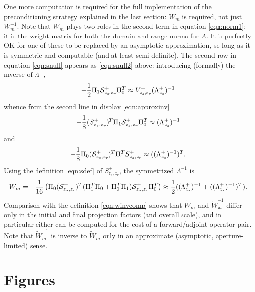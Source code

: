 One more computation is required for the full implementation of the
preconditioning strategy explained in the last section: $W_m$ is
required, not just $W_m^{-1}$. Note that $W_m$ plays two roles in the
second term in equation \ref{eqn:norm1}: it is the weight matrix for
both the domain and range norms for $A$. It is perfectly OK for one of
these to be replaced by an asymptotic approximation, so long as it is
symmetric and computable (and at least semi-definite). The second row
in equation \ref{eqn:snull} appears as \ref{eqn:snull2} above:
introducing (formally) the inverse of $\Lambda^+$,
\begin{equation}
  \label{eqn:snull2mod}
-\frac{1}{2}\Pi_1{\cal S}^{+}_{z_s,z_r}\Pi_0^T  \approx
V^{+}_{z_s,z_r}(\Lambda^{+}_{z_s})^{-1}
\end{equation}
whence from the second line in display \ref{eqn:approxinv}
\begin{equation}
  \label{eqn:laminv}
-\frac{1}{8}(S^+_{z_s,z_r})^T\Pi_1{\cal S}^{+}_{z_s,z_r}\Pi_0^T  
\approx (\Lambda^{+}_{z_s})^{-1}
\end{equation} 
and
\begin{equation}
  \label{eqn:laminvtr}
-\frac{1}{8}\Pi_0({\cal S}^{+}_{z_s,z_r})^T\Pi_1^T S^+_{z_s,z_r}
\approx ((\Lambda^{+}_{z_s})^{-1})^T.
\end{equation}
Using the definition \ref{eqn:sdef} of $S^+_{z_s,z_r}$, the
symmetrized $\Lambda^{-1}$ is
\begin{equation}
  \label{wcomp}
 \tilde{W}_m = -\frac{1}{16}\left(\Pi_0 ({\cal S}^{+}_{z_s,z_r})^T
   (\Pi_1^T \Pi_0 + \Pi_0^T \Pi_1) {\cal S}^{+}_{z_s,z_r} \Pi_0^T\right)
   \approx \frac{1}{2}((\Lambda^{+}_{z_s})^{-1}
   +((\Lambda^{+}_{z_s})^{-1})^T) .
\end{equation}
Comparison with the definition \ref{eqn:winvcomp} shows that
$\tilde{W}_m$ and $\tilde{W}_m^{-1}$ differ only in the initial and
final projection factors (and overall scale), and in particular either
can be computed for the cost of a forward/adjoint operator pair. Note
that $\tilde{W}_m^{-1}$ is inverse to $\tilde{W}_m$ only in an
approximate (asymptotic, aperture-limited) sense. 

\section{Figures}



